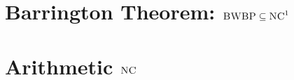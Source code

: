 \section{Barrington Theorem: $\textsc{BWBP}\subseteq\textsc{NC}^1$}

\section{Arithmetic $\textsc{NC}$}